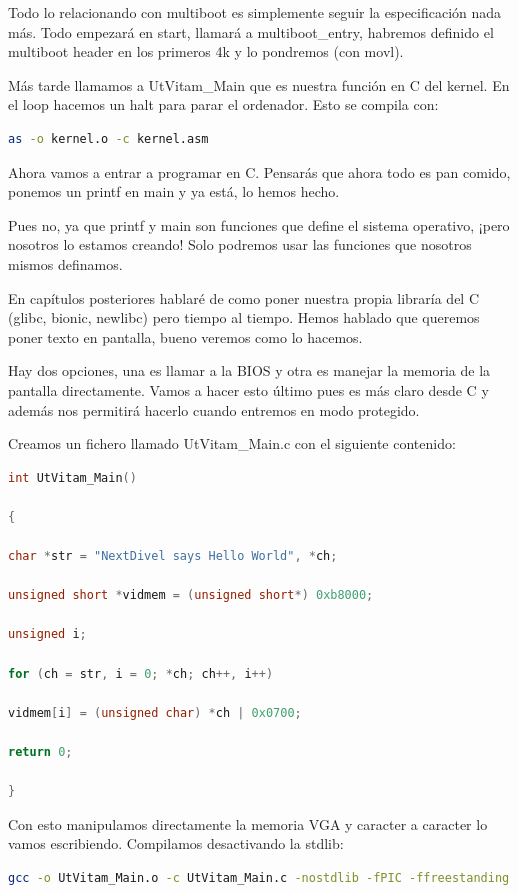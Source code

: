\documentclass[12pt, twoside]{report}
\begin{document}
Todo lo relacionando con multiboot es simplemente seguir la especificación nada más. Todo empezará en start, llamará a multiboot\_entry, habremos definido el multiboot header en los primeros 4k y lo pondremos (con movl).


Más tarde llamamos a UtVitam\_Main que es nuestra función en C del kernel. En el loop hacemos un halt para parar el ordenador. Esto se compila con:

\begin{lstlisting}[language=bash]
as -o kernel.o -c kernel.asm
\end{lstlisting}

Ahora vamos a entrar a programar en C. Pensarás que ahora todo es pan comido, ponemos un printf en main y ya está, lo hemos hecho.

Pues no, ya que printf y main son funciones que define el sistema operativo, ¡pero nosotros lo estamos creando! Solo podremos usar las funciones que nosotros mismos definamos.

En capítulos posteriores hablaré de como poner nuestra propia libraría del C (glibc, bionic, newlibc) pero tiempo al tiempo. Hemos hablado que queremos poner texto en pantalla, bueno veremos como lo hacemos.

Hay dos opciones, una es llamar a la BIOS y otra es manejar la memoria de la pantalla directamente. Vamos a hacer esto último pues es más claro desde C y además nos permitirá hacerlo cuando entremos en modo protegido.

Creamos un fichero llamado UtVitam\_Main.c con el siguiente contenido:

\begin{lstlisting}[language=C++]
int UtVitam_Main()

{

char *str = "NextDivel says Hello World", *ch;

unsigned short *vidmem = (unsigned short*) 0xb8000;

unsigned i;

for (ch = str, i = 0; *ch; ch++, i++)

vidmem[i] = (unsigned char) *ch | 0x0700;

return 0;

}
\end{lstlisting}

Con esto manipulamos directamente la memoria VGA y caracter a caracter lo vamos escribiendo. Compilamos desactivando la stdlib:

\begin{lstlisting}[language=bash]
gcc -o UtVitam_Main.o -c UtVitam_Main.c -nostdlib -fPIC -ffreestanding
\end{lstlisting}
\end{document}
